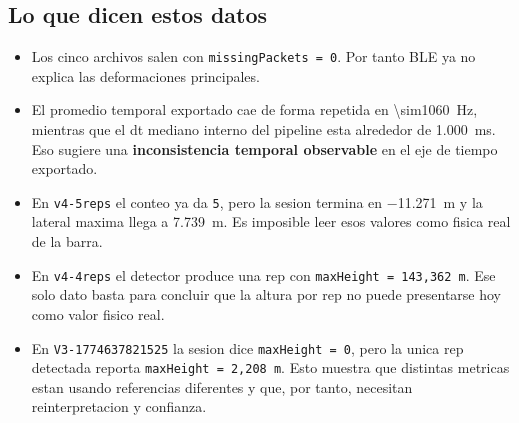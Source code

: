 \documentclass[11pt,a4paper]{article}
\begin{document}
\subsection*{Lo que dicen estos datos}
\begin{itemize}[leftmargin=14pt]
  \item Los cinco archivos salen con \texttt{missingPackets = 0}. Por tanto BLE ya no explica las deformaciones principales.
  \item El promedio temporal exportado cae de forma repetida en \SI{\sim1060}{Hz}, mientras que el dt mediano interno del pipeline esta alrededor de \SI{1,000}{ms}. Eso sugiere una \textbf{inconsistencia temporal observable} en el eje de tiempo exportado.
  \item En \texttt{v4-5reps} el conteo ya da \texttt{5}, pero la sesion termina en \SI{-11,271}{m} y la lateral maxima llega a \SI{7,739}{m}. Es imposible leer esos valores como fisica real de la barra.
  \item En \texttt{v4-4reps} el detector produce una rep con \texttt{maxHeight = 143,362 m}. Ese solo dato basta para concluir que la altura por rep no puede presentarse hoy como valor fisico real.
  \item En \texttt{V3-1774637821525} la sesion dice \texttt{maxHeight = 0}, pero la unica rep detectada reporta \texttt{maxHeight = 2,208 m}. Esto muestra que distintas metricas estan usando referencias diferentes y que, por tanto, necesitan reinterpretacion y confianza.
\end{itemize}
\end{document}
